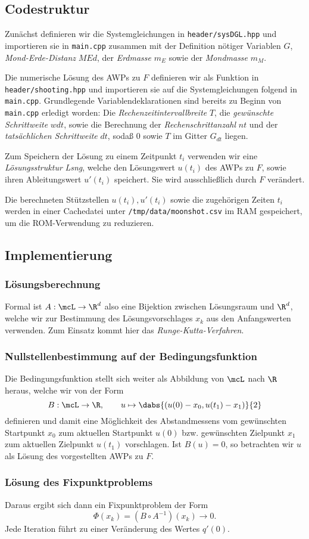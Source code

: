 \documentclass{subfiles}
\begin{document}
    \subsection*{Codestruktur}
        Zunächst definieren wir die Systemgleichungen in \texttt{header/sysDGL.hpp} und importieren sie in \texttt{main.cpp} zusammen mit der Definition nötiger Variablen $G$, \emph{Mond-Erde-Distanz} $MEd$, der \emph{Erdmasse} $m_E$ sowie der \emph{Mondmasse} $m_M$. 
        
        Die numerische Lösung des AWPs zu $F$ definieren wir als Funktion in \texttt{header/shooting.hpp} und importieren sie auf die Systemgleichungen folgend in \texttt{main.cpp}. Grundlegende Variablendeklarationen sind bereits zu Beginn von \texttt{main.cpp} erledigt worden: Die \emph{Rechenzeitintervallbreite} $T$, die \emph{gewünschte Schrittweite} $wdt$, sowie die Berechnung der \emph{Rechenschrittanzahl} $nt$ und der \emph{tatsächlichen Schrittweite} $dt$, sodaß $0$ sowie $T$ im Gitter $G_{dt}$ liegen. 
        
        Zum Speichern der Lösung zu einem Zeitpunkt $t_i$ verwenden wir eine \emph{Lösungsstruktur} \emph{Lsng}, welche den Lösungswert $u(t_i)$ des AWPs zu $F$, sowie ihren Ableitungswert $u'(t_i)$ speichert. Sie wird ausschließlich durch $F$ verändert.

        Die berechneten Stützstellen $u(t_i), u'(t_i)$ sowie die zugehörigen Zeiten $t_i$ werden in einer Cachedatei unter \texttt{/tmp/data/moonshot.csv} im RAM gespeichert, um die ROM-Verwendung zu reduzieren. 

    \subsection*{Implementierung}
        \subsubsection*{Lösungsberechnung}

            Formal ist $A:\mcL\to\R^d$ also eine Bijektion zwischen Lösungsraum und $\R^d$, welche wir zur Bestimmung des Lösungsvorschlages $x_k$ aus den Anfangswerten verwenden. Zum Einsatz kommt hier das \emph{Runge-Kutta-Verfahren}. 

        \subsubsection*{Nullstellenbestimmung auf der Bedingungsfunktion}
            Die Bedingungsfunktion stellt sich weiter als Abbildung von $\mcL$ nach $\R$ heraus, welche wir von der Form 
            \[
                B:\mcL\to\R,\qquad u\mapsto \dabs{(u(0) - x_0,u(t_1) - x_1)}{2}
            \]
            definieren und damit eine Möglichkeit des Abstandmessens vom gewünschten Startpunkt $x_0$ zum aktuellen Startpunkt $u(0)$ bzw. gewünschten Zielpunkt $x_1$ zum aktuellen Zielpunkt $u(t_1)$ vorschlagen. Ist $B(u) = 0$, so betrachten wir $u$ als Lösung des vorgestellten AWPs zu $F$. 

        \subsubsection*{Lösung des Fixpunktproblems}
            Daraus ergibt sich dann ein Fixpunktproblem der Form 
            \[
                \Phi(x_k) = (B\circ A^{-1})(x_k) \to 0.
            \]
            Jede Iteration führt zu einer Veränderung des Wertes $q'(0)$.
\end{document}
